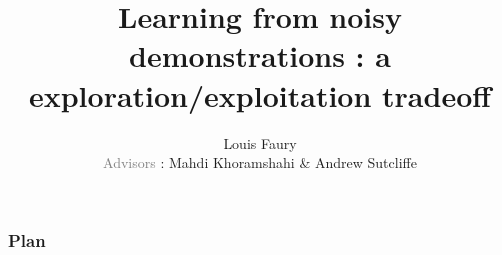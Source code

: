 \documentclass[t]{beamer}
\begin{document}
\title[Learning from noisy demonstrations : a exploration/exploitation tradeoff]{Learning from noisy demonstrations : a exploration/exploitation tradeoff}
\author[]{Louis Faury\\ \vspace{5pt} \small{\textcolor{gray}{Advisors} : Mahdi Khoramshahi \& Andrew Sutcliffe}}
\newenvironment{subenv}{\only{\setbeamercolor{local structure}{fg=red}}}{}
\graphicspath{{../report/Images/}}
\titlepage

\begin{frame}[t]
	\vspace{-3ex}
	\frametitle{Plan}
  	\tableofcontents
\end{frame}
\end{document}
